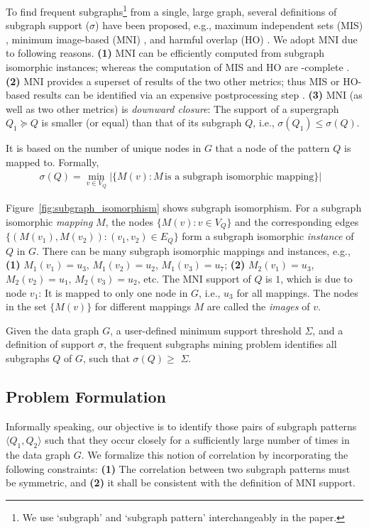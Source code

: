 To find frequent subgraphs\footnote{{\footnotesize We use `subgraph' and `subgraph pattern' interchangeably in the paper.}}
from a single, large graph, several definitions of subgraph support ($\sigma$)
have been proposed, e.g., maximum independent sets (MIS) \cite{KK04},
minimum image-based (MNI) \cite{BN08}, and harmful overlap (HO) \cite{FB07}.
We adopt MNI  \cite{BN08}
due to following reasons. {\bf (1)} MNI
can be efficiently computed from subgraph isomorphic instances;
whereas the computation of MIS and HO are \NP-complete \cite{KK04,FB07}.
{\bf (2)} MNI provides a superset of results of the two other metrics; thus
MIS or HO-based results can be identified via an expensive postprocessing step
\cite{EASK14}. {\bf (3)} MNI (as well as two other metrics) is {\em downward closure}:
The support of a supergraph $Q_1 \succeq Q$ is smaller (or equal) than that
of its subgraph $Q$, i.e., $\sigma(Q_1) \le \sigma(Q)$.

It is based on the number of unique nodes in $G$ that a node of the pattern $Q$
is mapped to. Formally,
%
\begin{align}
\displaystyle \sigma(Q) = \min_{v \in V_Q} |\{M(v) : M \,\text{is a subgraph isomorphic mapping}\}| \nonumber &
\end{align}
%
\begin{exple}
Figure~\ref{fig:subgraph_isomorphism} shows subgraph isomorphism. For a subgraph isomorphic
{\em mapping} $M$, the nodes $\{M(v):v\in V_Q\}$ and the corresponding edges $\{(M(v_1),M(v_2)):(v_1,v_2)\in E_Q\}$
form a subgraph isomorphic {\em instance} of $Q$ in $G$.
There can be many subgraph isomorphic mappings and instances, e.g.,
{\bf (1)} $M_1(v_1)= u_3$, $M_1(v_2)= u_2$, $M_1(v_3)= u_7$; {\bf (2)} $M_2(v_1) = u_3$, $M_2(v_2) = u_1$,
$M_2(v_3) = u_2$, etc. The MNI support of $Q$ is $1$, which is due to
node $v_1$: It is mapped to only one node in $G$, i.e., $u_3$ for all
mappings. The nodes in the set $\{M(v)\}$ for different mappings $M$ are called the {\em images} of $v$.
\end{exple}

 Given the data graph $G$, a user-defined minimum support threshold $\Sigma$, and
a definition of support $\sigma$, the frequent subgraphs mining problem identifies all subgraphs $Q$ of $G$, such that
$\sigma(Q)\ge$ $\Sigma$.
%
\subsection{Problem Formulation}
\label{sec:problem}
%
Informally speaking, our objective is to identify those pairs of subgraph patterns $\langle Q_1, Q_2\rangle$ such that
they occur closely for a sufficiently large number of times in the data graph $G$. We formalize this notion of
correlation by incorporating the following constraints: {\bf (1)} The correlation between two subgraph patterns must be
symmetric, and {\bf (2)} it shall be consistent with the definition of MNI support.

